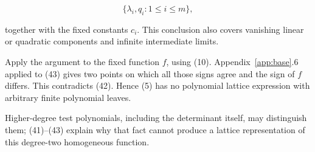 \documentclass[11pt]{article}
\begin{document}
\[
\{\lambda_i,q_i:1\le i\le m\},
\tag{43}
\]

together with the fixed constants \(c_i\). This conclusion also covers
vanishing linear or quadratic components and infinite intermediate limits.

Apply the argument to the fixed function \(f\), using (10). Appendix~\ref{app:base}.6
applied to (43) gives two points on which all those signs agree and the sign
of \(f\) differs. This contradicts (42). Hence (5) has no polynomial lattice
expression with arbitrary finite polynomial leaves.

Higher-degree test polynomials,
including the determinant itself, may distinguish them; (41)--(43) explain
why that fact cannot produce a lattice representation of this degree-two
homogeneous function.
\end{document}
